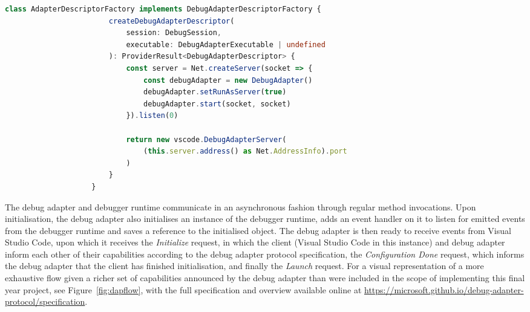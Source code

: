 \documentclass[12pt,pdftex,titlepage]{report}
\begin{document}
            \begin{spacing}{1.0}
                \begin{lstlisting}[label={lst:descriptor}, gobble=20, language=TypeScript, caption={The method used to initialise the Debug Adapter and return the Debug Adapter Descriptor to Visual Studio Code.}]
                    class AdapterDescriptorFactory implements DebugAdapterDescriptorFactory {
                        createDebugAdapterDescriptor(
                            session: DebugSession,
                            executable: DebugAdapterExecutable | undefined
                        ): ProviderResult<DebugAdapterDescriptor> {
                            const server = Net.createServer(socket => {
                                const debugAdapter = new DebugAdapter()
                                debugAdapter.setRunAsServer(true)
                                debugAdapter.start(socket, socket)
                            }).listen(0)

                            return new vscode.DebugAdapterServer(
                                (this.server.address() as Net.AddressInfo).port
                            )
                        }
                    }
                \end{lstlisting}
            \end{spacing}
            \bigskip

            The debug adapter and debugger runtime communicate in an asynchronous fashion through regular method invocations. Upon initialisation, the debug adapter also initialises an instance of the debugger runtime, adds an event handler 
            on it to listen for emitted events from the debugger runtime and saves a reference to the initialised object. The debug adapter is then ready to receive events from Visual Studio Code, upon which it receives the \textit{Initialize}
            request, in which the client (Visual Studio Code in this instance) and debug adapter inform each other of their capabilities according to the debug adapter protocol specification, the \textit{Configuration Done} request, which informs 
            the debug adapter that the client has finished initialisation, and finally the \textit{Launch} request. For a visual representation of a more exhaustive flow given a richer set of capabilities announced by the debug adapter than were
            included in the scope of implementing this final year project, see Figure~\ref{fig:dapflow}, with the full specification and overview available online at \url{https://microsoft.github.io/debug-adapter-protocol/specification}.
            
\end{document}
